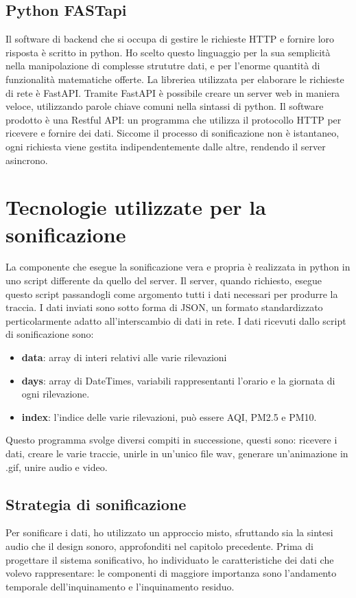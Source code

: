 \subsection{Python FASTapi}
Il software di backend che si occupa di gestire le richieste HTTP e fornire loro risposta è scritto in python.
Ho scelto questo linguaggio per la sua semplicità nella manipolazione di complesse strututre dati, e per l'enorme quantità di funzionalità matematiche offerte.
La libreriea utilizzata per elaborare le richieste di rete è FastAPI.
Tramite FastAPI è possibile creare un server web in maniera veloce, utilizzando parole chiave comuni nella sintassi di python.
Il software prodotto è una Restful API: un programma che utilizza il protocollo HTTP per ricevere e fornire dei dati.
Siccome il processo di sonificazione non è istantaneo, ogni richiesta viene gestita indipendentemente dalle altre, rendendo il server asincrono.




\section{Tecnologie utilizzate per la sonificazione}

La componente che esegue la sonificazione vera e propria è realizzata in python in uno script differente da quello del server.
Il server, quando richiesto, esegue questo script passandogli come argomento tutti i dati necessari per produrre la traccia.
I dati inviati sono sotto forma di JSON, un formato standardizzato perticolarmente adatto all'interscambio di dati in rete.
I dati ricevuti dallo script di sonificazione sono: 
\begin{itemize}
    \item \textbf{data}: array di interi relativi alle varie rilevazioni
    \item \textbf{days}: array di DateTimes, variabili rappresentanti l'orario e la giornata di ogni rilevazione.
    \item \textbf{index}: l'indice delle varie rilevazioni, può essere AQI, PM2.5 e PM10.
\end{itemize}
Questo programma svolge diversi compiti in successione, questi sono: ricevere i dati, creare le varie traccie, unirle in un'unico file wav, generare un'animazione in .gif, unire audio e video.

\subsection{Strategia di sonificazione}
Per sonificare i dati, ho utilizzato un approccio misto, sfruttando sia la sintesi audio che il design sonoro, approfonditi nel capitolo precedente.
Prima di progettare il sistema sonificativo, ho individuato le caratteristiche dei dati che volevo rappresentare:
le componenti di maggiore importanza sono l’andamento temporale dell'inquinamento e l'inquinamento residuo.
